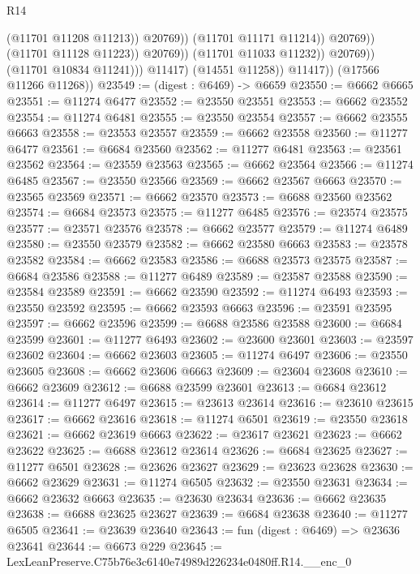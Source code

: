 \begin{lexlean}{R14}
\begin{coremodule}
                                          (@11701 @11208 @11213))
                                        @20769))
                                    (@11701 @11171 @11214))
                                  @20769))
                              (@11701 @11128 @11223))
                            @20769))
                        (@11701 @11033 @11232))
                      @20769))
                  (@11701 @10834 @11241)))
              @11417)
            (@14551 @11258))
          @11417))
      (@17566 @11266 @11268))
@23549 := (digest : @6469) -> @6659
@23550 := @6662 @6665
@23551 := @11274 @6477
@23552 := @23550 @23551
@23553 := @6662 @23552
@23554 := @11274 @6481
@23555 := @23550 @23554
@23557 := @6662 @23555 @6663
@23558 := @23553 @23557
@23559 := @6662 @23558
@23560 := @11277 @6477
@23561 := @6684 @23560
@23562 := @11277 @6481
@23563 := @23561 @23562
@23564 := @23559 @23563
@23565 := @6662 @23564
@23566 := @11274 @6485
@23567 := @23550 @23566
@23569 := @6662 @23567 @6663
@23570 := @23565 @23569
@23571 := @6662 @23570
@23573 := @6688 @23560 @23562
@23574 := @6684 @23573
@23575 := @11277 @6485
@23576 := @23574 @23575
@23577 := @23571 @23576
@23578 := @6662 @23577
@23579 := @11274 @6489
@23580 := @23550 @23579
@23582 := @6662 @23580 @6663
@23583 := @23578 @23582
@23584 := @6662 @23583
@23586 := @6688 @23573 @23575
@23587 := @6684 @23586
@23588 := @11277 @6489
@23589 := @23587 @23588
@23590 := @23584 @23589
@23591 := @6662 @23590
@23592 := @11274 @6493
@23593 := @23550 @23592
@23595 := @6662 @23593 @6663
@23596 := @23591 @23595
@23597 := @6662 @23596
@23599 := @6688 @23586 @23588
@23600 := @6684 @23599
@23601 := @11277 @6493
@23602 := @23600 @23601
@23603 := @23597 @23602
@23604 := @6662 @23603
@23605 := @11274 @6497
@23606 := @23550 @23605
@23608 := @6662 @23606 @6663
@23609 := @23604 @23608
@23610 := @6662 @23609
@23612 := @6688 @23599 @23601
@23613 := @6684 @23612
@23614 := @11277 @6497
@23615 := @23613 @23614
@23616 := @23610 @23615
@23617 := @6662 @23616
@23618 := @11274 @6501
@23619 := @23550 @23618
@23621 := @6662 @23619 @6663
@23622 := @23617 @23621
@23623 := @6662 @23622
@23625 := @6688 @23612 @23614
@23626 := @6684 @23625
@23627 := @11277 @6501
@23628 := @23626 @23627
@23629 := @23623 @23628
@23630 := @6662 @23629
@23631 := @11274 @6505
@23632 := @23550 @23631
@23634 := @6662 @23632 @6663
@23635 := @23630 @23634
@23636 := @6662 @23635
@23638 := @6688 @23625 @23627
@23639 := @6684 @23638
@23640 := @11277 @6505
@23641 := @23639 @23640
@23643 := fun (digest : @6469) => @23636 @23641
@23644 := @6673 @229
@23645 := LexLeanPreserve.C75b76e3c6140e74989d226234e0480ff.R14.__enc_0

\end{coremodule}
\end{lexlean}
